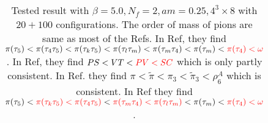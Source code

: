 \begin{table}
\begin{center}
\begin{tabular}{cc|cc}
\hline
\end{tabular}
\end{center}
\caption{\label{tab:staggeredMeson2}Tested result with $\beta=5.0,N_f=2,am=0.25,4^3\times 8$ with $20+100$ configurations. The order of mass of pions are same as most of the Refs. In Ref, they find $\pi(\tau _5)<\pi(\tau _4\tau _5)<\pi(\tau _k\tau _5)<\pi(\tau _l\tau _m)<\pi(\tau _m\tau _4)<\pi(\tau _m)<\textcolor[rgb]{1,0,0}{\pi(\tau _4)<\omega}$. In Ref, they find $PS<VT<\textcolor[rgb]{1,0,0}{PV<SC}$ which is only partly consistent. In Ref. they find $\pi < \tilde{\pi} < \pi_3 < \tilde{\pi}_3<\rho_6^A$ which is consistent. In Ref they find $\pi(\tau _5)<\textcolor[rgb]{1,0,0}{\pi(\tau _k\tau _5)<\pi(\tau _4\tau _5)}<\textcolor[rgb]{1,0,0}{\pi(\tau _m\tau _4)<\pi(\tau _l\tau _m)}<\pi(\tau _m)<\textcolor[rgb]{1,0,0}{\pi(\tau _4)<\omega}$.}
\end{table} 